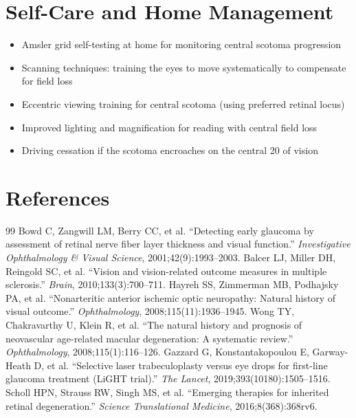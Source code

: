 \section*{Self-Care and Home Management}
\begin{itemize}
  \item Amsler grid self-testing at home for monitoring central scotoma progression
  \item Scanning techniques: training the eyes to move systematically to compensate for field loss
  \item Eccentric viewing training for central scotoma (using preferred retinal locus)
  \item Improved lighting and magnification for reading with central field loss
  \item Driving cessation if the scotoma encroaches on the central 20\textdegree{} of vision
\end{itemize}

\section*{References}
\begin{thebibliography}{99}
 Bowd C, Zangwill LM, Berry CC, et al. ``Detecting early glaucoma by assessment of retinal nerve fiber layer thickness and visual function.'' \textit{Investigative Ophthalmology \& Visual Science}, 2001;42(9):1993--2003.
 Balcer LJ, Miller DH, Reingold SC, et al. ``Vision and vision-related outcome measures in multiple sclerosis.'' \textit{Brain}, 2010;133(3):700--711.
 Hayreh SS, Zimmerman MB, Podhajsky PA, et al. ``Nonarteritic anterior ischemic optic neuropathy: Natural history of visual outcome.'' \textit{Ophthalmology}, 2008;115(11):1936--1945.
 Wong TY, Chakravarthy U, Klein R, et al. ``The natural history and prognosis of neovascular age-related macular degeneration: A systematic review.'' \textit{Ophthalmology}, 2008;115(1):116--126.
 Gazzard G, Konstantakopoulou E, Garway-Heath D, et al. ``Selective laser trabeculoplasty versus eye drops for first-line glaucoma treatment (LiGHT trial).'' \textit{The Lancet}, 2019;393(10180):1505--1516.
 Scholl HPN, Strauss RW, Singh MS, et al. ``Emerging therapies for inherited retinal degeneration.'' \textit{Science Translational Medicine}, 2016;8(368):368rv6.
\end{thebibliography}
